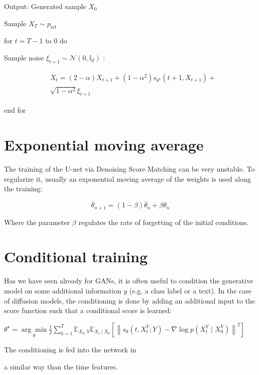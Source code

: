 \documentclass[10pt]{article}
\begin{document}
Output: Generated sample $X_{0}$

Sample $X_{T} \sim p_{\text {ref }}$

for $t=T-1$ to 0 do

Sample noise $\xi_{t+1} \sim \mathcal{N}\left(0, \mathbb{I}_{d}\right)$ :

$$
\begin{aligned}
& X_{t}=(2-\alpha) X_{t+1}+\left(1-\alpha^{2}\right) s_{\theta^{\star}}\left(t+1, X_{t+1}\right)+ \\
& \sqrt{1-\alpha^{2}} \xi_{t+1}
\end{aligned}
$$

end for

\section*{Exponential moving average}
The training of the U-net via Denoising Score Matching can be very unstable. To regularize it, usually an exponential moving average of the weights is used along the training:

$$
\bar{\theta}_{n+1}=(1-\beta) \bar{\theta}_{n}+\beta \theta_{n}
$$

Where the parameter $\beta$ regulates the rate of forgetting of the initial conditions.

\section*{Conditional training}
Has we have seen already for GANs, it is often useful to condition the generative model on some additional information $y$ (e.g. a class label or a text). In the case of diffusion models, the conditioning is done by adding an additional input to the score function such that a conditional score is learned:

$\theta^{\star}=\underset{\theta}{\arg \min } \frac{1}{2} \sum_{k=1}^{T} \mathbb{E}_{X_{0}, Y} \mathbb{E}_{X_{t} \mid X_{0}}\left[\left\|s_{\theta}\left(t, X_{t}^{Y} ; Y\right)-\nabla \log p\left(X_{t}^{Y} \mid X_{0}^{Y}\right)\right\|^{2}\right]$

The conditioning is fed into the network in

a similar way than the time features.
\end{document}
